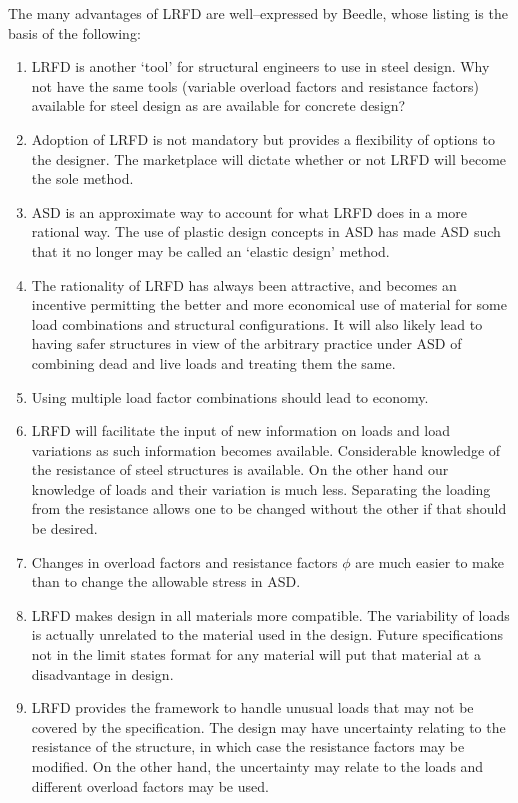 The many advantages of LRFD are well--expressed by Beedle, whose listing is the basis of the following:
\begin{mdframed}[style=highlight]
\begin{enumerate}
\item LRFD is another `tool' for structural engineers to use in steel design. Why not have the same tools (variable overload factors and resistance factors) available for steel design as are available for concrete design?
\item Adoption of LRFD is not mandatory but provides a flexibility of options to the designer. The marketplace will dictate whether or not LRFD will become the sole method.
\item ASD is an approximate way to account for what LRFD does in a more rational way. The use of plastic design concepts in ASD has made ASD such that it no longer may be called an `elastic design' method.
\item The rationality of LRFD has always been attractive, and becomes an incentive permitting the better and more economical use of material for some load combinations and structural configurations. It will also likely lead to having safer structures in view of the arbitrary practice under ASD of combining dead and live loads and treating them the same.
\item Using multiple load factor combinations should lead to economy.
\item LRFD will facilitate the input of new information on loads and load variations as such information becomes available. Considerable knowledge of the resistance of steel structures is available. On the other hand our knowledge of loads and their variation is much less. Separating the loading from the resistance allows one to be changed without the other if that should be desired.
\item Changes in overload factors and resistance factors $\phi$ are much easier to make than to change the allowable stress in ASD.
\item LRFD makes design in all materials more compatible. The variability of loads is actually unrelated to the material used in the design. Future specifications not in the limit states format for any material will put that material at a disadvantage in design.
\item LRFD provides the framework to handle unusual loads that may not be covered by the specification. The design may have uncertainty relating to the resistance of the structure, in which case the resistance factors may be modified. On the other hand, the uncertainty may relate to the loads and different overload factors may be used.

\end{enumerate}
\end{mdframed}
